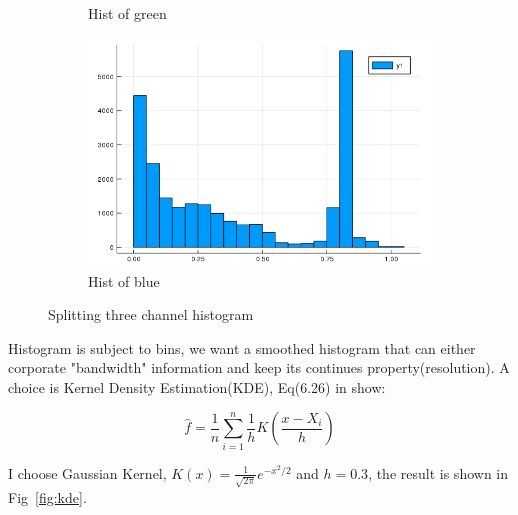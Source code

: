 \documentclass{article}
\begin{document}
\begin{figure}[htb]
\begin{subfigure}[b]{0.24\linewidth}
    \caption{Hist of green}
  \end{subfigure}
  \begin{subfigure}[b]{0.24\linewidth}
    \includegraphics[width=\linewidth]{images/hist_b.png}
    \caption{Hist of blue}
  \end{subfigure}
  \caption{Splitting three channel histogram}
  \label{fig:hist_g_rgb}
\end{figure}

Histogram is subject to bins, we want a smoothed histogram that can either corporate "bandwidth" information and keep 
its continues property(resolution). A choice is Kernel Density Estimation(KDE), Eq(6.26) in \cite{wasserman2006all} show:

$$
\hat{f} = \frac{1}{n} \sum_{i=1}^n \frac{1}{h} K\left( \frac{x-X_i}{h} \right)
$$

I choose Gaussian Kernel, $K(x)=\frac{1}{\sqrt{2\pi}}e^{-x^2/2}$ and $h=0.3$, the result is shown in Fig~\ref{fig:kde}.
\end{document}
